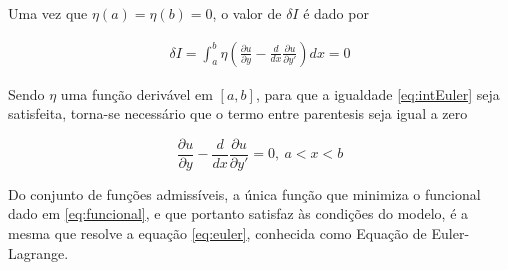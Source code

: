 Uma vez que $\eta(a) = \eta(b) = 0$, o valor de $ \delta I $ é dado por

\begin{equation}
\label{eq:intEuler}
\begin{split}
\delta I = \int_{a}^{b} \eta \left(\frac{\partial u}{\partial y} - \frac{d}{dx} 
\frac{\partial u}{\partial y'}\right)  dx = 0
\end{split}
\end{equation}

Sendo $ \eta $ uma função derivável em $ [a,b] $, para que a igualdade \ref{eq:intEuler} seja satisfeita, torna-se necessário que o termo entre parentesis seja igual a zero

\begin{equation}
\label{eq:euler}
\frac{\partial u}{\partial y} - \frac{d}{dx} 
\frac{\partial u}{\partial y'} = 0, \ a < x < b
\end{equation}

Do conjunto de funções admissíveis, a única função que minimiza o funcional dado em \ref{eq:funcional}, e que portanto satisfaz às condições do modelo, é a mesma que resolve a equação \ref{eq:euler}, conhecida como Equação de Euler-Lagrange.
